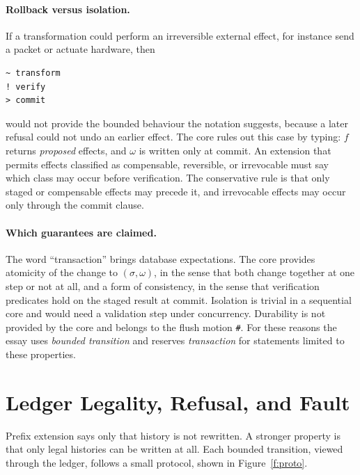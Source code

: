 \documentclass[11pt]{article}
\newcommand{\code}[1]{\texttt{#1}}
\begin{document}
\paragraph{Rollback versus isolation.} If a transformation could perform an irreversible external effect, for instance send a packet or actuate hardware, then
\begin{Verbatim}
~ transform
! verify
> commit
\end{Verbatim}
would not provide the bounded behaviour the notation suggests, because a later refusal could not undo an earlier effect. The core rules out this case by typing: $f$ returns \emph{proposed} effects, and $\omega$ is written only at commit. An extension that permits effects classified as compensable, reversible, or irrevocable must say which class may occur before verification. The conservative rule is that only staged or compensable effects may precede it, and irrevocable effects may occur only through the commit clause.

\paragraph{Which guarantees are claimed.} The word ``transaction'' brings database expectations. The core provides atomicity of the change to $(\sigma,\omega)$, in the sense that both change together at one step or not at all, and a form of consistency, in the sense that verification predicates hold on the staged result at commit. Isolation is trivial in a sequential core and would need a validation step under concurrency. Durability is not provided by the core and belongs to the flush motion \code{\#}. For these reasons the essay uses \emph{bounded transition} and reserves \emph{transaction} for statements limited to these properties.

\section{Ledger Legality, Refusal, and Fault}\label{s:legal}

Prefix extension says only that history is not rewritten. A stronger property is that only legal histories can be written at all. Each bounded transition, viewed through the ledger, follows a small protocol, shown in Figure~\ref{f:proto}.
\end{document}
